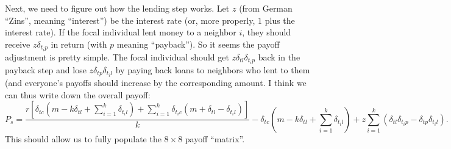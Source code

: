 \documentclass[14pt, a4paper, justified]{article}
\begin{document}
Next, we need to figure out how the lending step works.
Let $z$ (from German ``Zins'', meaning ``interest'') be the interest rate (or, more properly, $1$ plus the interest rate).
If the focal individual lent money to a neighbor $i$, they should receive $z \delta_{t_i p}$ in return (with $p$ meaning ``payback'').
So it seems the payoff adjustment is pretty simple.
The focal individual should get $z\delta_{tl} \delta_{t_i p}$ back in the payback step and lose $z \delta_{tp} \delta_{t_i l}$ by paying back loans to neighbors who lent to them (and everyone's payoffs should increase by the corresponding amount.
I think we can thus write down the overall payoff:
\begin{equation}
    P_s = \frac{r[\delta_{tc}(m - k\delta_{tl} + \sum_{i=1}^k \delta_{t_i l}) + \sum_{i=1}^k \delta_{t_i c} (m + \delta_{tl} - \delta_{t_i l})]}{k} - \delta_{tc}(m - k\delta_{tl} + \sum_{i=1}^k \delta_{t_i l}) + z\sum_{i=1}^k (\delta_{tl} \delta_{t_i p} - \delta_{tp} \delta_{t_i l}).
\end{equation}
This should allow us to fully populate the $8 \times 8$ payoff ``matrix''.



\end{document}
